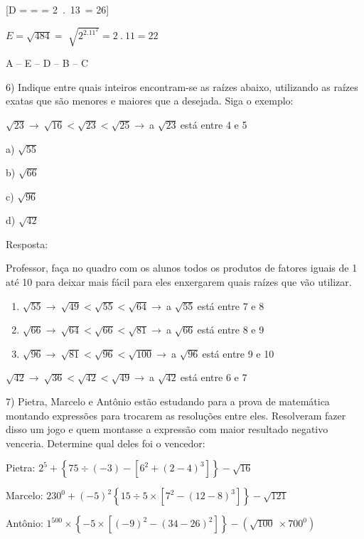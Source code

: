 [D =  =  = 2\ .\ 13\  = 26]

\(E = \sqrt{484} =\) \(\sqrt{2^2.11^2} = 2\ .\ 11 = 22\)

A -- E -- D -- B -- C

6) Indique entre quais inteiros encontram-se as raízes abaixo,
utilizando as raízes exatas que são menores e maiores que a desejada.
Siga o exemplo:

\(\sqrt{23} \rightarrow \ \sqrt{16} < \sqrt{23} < \sqrt{25} \rightarrow \ \)a
\(\sqrt{23}\ \)está entre 4 e 5

a) \(\sqrt{55}\)

b) \(\sqrt{66}\)

c) \(\sqrt{96}\)

d) \(\sqrt{42}\)

Resposta:

Professor, faça no quadro com os alunos todos os produtos de fatores
iguais de 1 até 10 para deixar mais fácil para eles enxergarem quais
raízes que vão utilizar.

\begin{enumerate}
\def\labelenumi{\alph{enumi})}
\item
  \(\sqrt{55} \rightarrow \ \sqrt{49} < \sqrt{55} < \sqrt{64} \rightarrow \ \)a
  \(\sqrt{55}\ \)está entre 7 e 8
\item
  \(\sqrt{66} \rightarrow \ \sqrt{64} < \sqrt{66} < \sqrt{81} \rightarrow \ \)a
  \(\sqrt{66}\ \)está entre 8 e 9
\item
  \(\sqrt{96} \rightarrow \ \sqrt{81} < \sqrt{96} < \sqrt{100} \rightarrow \ \)a
  \(\sqrt{96}\ \)está entre 9 e 10
\end{enumerate}

\(\sqrt{42} \rightarrow \ \sqrt{36} < \sqrt{42} < \sqrt{49} \rightarrow \ \)a
\(\sqrt{42}\ \)está entre 6 e 7

7) Pietra, Marcelo e Antônio estão estudando para a prova de matemática
montando expressões para trocarem as resoluções entre eles. Resolveram
fazer disso um jogo e quem montasse a expressão com maior resultado
negativo venceria. Determine qual deles foi o vencedor:

Pietra:
\(2^{5} + \left\{ 75 \div \left( - 3 \right) - \left\lbrack 6^{2} + \left( 2 - 4 \right)^{3} \right\rbrack \right\} - \sqrt{16}\)

Marcelo:
\(230^{0} + ( - 5)^2\left\{ 15 \div 5 \times \left\lbrack 7^{2} - \left( 12 - 8 \right)^{3} \right\rbrack \right\} - \sqrt{121}\)

Antônio:
\(1^{500} \times \left\{ - 5 \times \left\lbrack \left( - 9 \right)^{2} - \left( 34 - 26 \right)^{2} \right\rbrack \right\} - (\sqrt{100}\  \times 700^{0})\)

